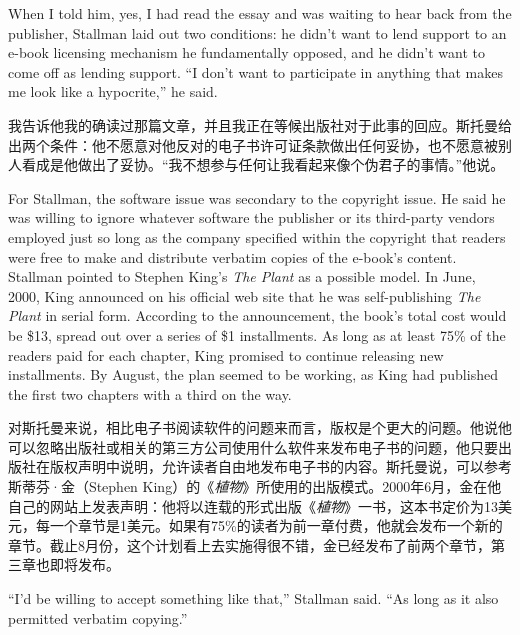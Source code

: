 \ifdefined\eng
When I told him, yes, I had read the essay and was waiting to hear back from the publisher, Stallman laid out two conditions: he didn't want to lend support to an e-book licensing mechanism he fundamentally opposed, and he didn't want to come off as lending support. ``I don't want to participate in anything that makes me look like a hypocrite,'' he said.
\fi

\ifdefined\chs
我告诉他我的确读过那篇文章，并且我正在等候出版社对于此事的回应。斯托曼给出两个条件：他不愿意对他反对的电子书许可证条款做出任何妥协，也不愿意被别人看成是他做出了妥协。``我不想参与任何让我看起来像个伪君子的事情。''他说。
\fi

\ifdefined\eng
For Stallman, the software issue was secondary to the copyright issue. He said he was willing to ignore whatever software the publisher or its third-party vendors employed just so long as the company specified within the copyright that readers were free to make and distribute verbatim copies of the e-book's content. Stallman pointed to Stephen King's \textit{The Plant} as a possible model. In June, 2000, King announced on his official web site that he was self-publishing \textit{The Plant} in serial form. According to the announcement, the book's total cost would be \$13, spread out over a series of \$1 installments. As long as at least 75\% of the readers paid for each chapter, King promised to continue releasing new installments. By August, the plan seemed to be working, as King had published the first two chapters with a third on the way.
\fi

\ifdefined\chs
对斯托曼来说，相比电子书阅读软件的问题来而言，版权是个更大的问题。他说他可以忽略出版社或相关的第三方公司使用什么软件来发布电子书的问题，他只要出版社在版权声明中说明，允许读者自由地发布电子书的内容。斯托曼说，可以参考斯蒂芬·金（Stephen King）的《\textit{植物}》所使用的出版模式。2000年6月，金在他自己的网站上发表声明：他将以连载的形式出版《\textit{植物}》一书，这本书定价为13美元，每一个章节是1美元。如果有75\%的读者为前一章付费，他就会发布一个新的章节。截止8月份，这个计划看上去实施得很不错，金已经发布了前两个章节，第三章也即将发布。
\fi

\ifdefined\eng
``I'd be willing to accept something like that,'' Stallman said. ``As long as it also permitted verbatim copying.'' %
\fi

